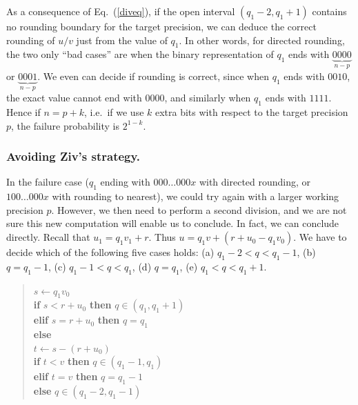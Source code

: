 \documentclass[12pt]{amsart}
\def\q{\hspace*{5mm}}
\begin{document}
As a consequence of Eq.~(\ref{diveq}), if the open interval $(q_1-2, q_1+1)$
contains no rounding boundary for the target precision, we can deduce the
correct rounding of $u/v$ just from the value of $q_1$.
In other words, for directed rounding, the two only ``bad cases'' are when
the binary representation of $q_1$ ends with $\underbrace{0000}_{n-p}$
or $\underbrace{0001}_{n-p}$.
We even can decide if rounding is correct, since when $q_1$ ends with $0010$,
the exact value cannot end with $0000$, and similarly
when $q_1$ ends with $1111$.
Hence if $n=p+k$, i.e.\ if we use $k$ extra bits with respect to the target
precision $p$, the failure probability is $2^{1-k}$.

\subsubsection{Avoiding Ziv's strategy.}
In the failure case ($q_1$ ending with $000\ldots 000x$ with directed rounding,
or $100 \ldots 000x$ with rounding to nearest),
we could try again with a larger working precision $p$.
However, we then need to perform a second
division, and we are not sure this new computation will enable us to conclude.
In fact, we can conclude directly. Recall that $u_1 = q_1 v_1 + r$.
Thus $u = q_1 v + (r + u_0 - q_1 v_0)$.
We have to decide which of the following five cases holds:
(a) $q_1 - 2 < q < q_1 - 1$, (b) $q = q_1-1$,
(c) $q_1-1 < q < q_1$, (d) $q=q_1$, (e) $q_1 < q < q_1+1$.
\begin{quote}
$s \leftarrow q_1 v_0$ \\
\textbf{if} $s < r + u_0$ \textbf{then} $q \in (q_1, q_1+1)$ \\
\textbf{elif} $s = r + u_0$ \textbf{then} $q = q_1$ \\
\textbf{else} \\ %
\q $t \leftarrow s - (r + u_0)$ \\ %
\q \textbf{if} $t < v$ \textbf{then} $q \in (q_1 - 1, q_1)$ \\
\textbf{elif} $t=v$ \textbf{then} $q = q_1-1$ \\
\textbf{else} $q \in (q_1 - 2, q_1-1)$
\end{quote}
\end{document}
